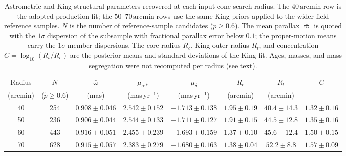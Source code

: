 \documentclass{aa}
\begin{document}
\begin{appendix}
\begin{table}
	\caption{Astrometric and King-structural parameters recovered at each input cone-search radius. The $40\,\mathrm{arcmin}$ row is the adopted production fit; the $50$--$70\,\mathrm{arcmin}$ rows use the same King priors applied to the wider-field reference samples. $N$ is the number of reference-sample candidates ($\tilde{p}\geq0.6$). The mean parallax $\bar{\varpi}$ is quoted with the $1\sigma$ dispersion of the subsample with fractional parallax error below $0.1$; the proper-motion means carry the $1\sigma$ member dispersions. The core radius $R_c$, King outer radius $R_t$, and concentration $C=\log_{10}(R_t/R_c)$ are the posterior means and standard deviations of the King fit. Ages, masses, and mass segregation were not recomputed per radius (see text).}
	\centering
	\begin{tabular}{cccccccc}
		\hline
		Radius & $N$ & $\bar{\varpi}$ & $\mu_{\alpha*}$ & $\mu_{\delta}$ & $R_c$ & $R_t$ & $C$ \\
		(arcmin) & ($\tilde{p}\geq0.6$) & (mas) & (mas\,yr$^{-1}$) & (mas\,yr$^{-1}$) & (arcmin) & (arcmin) &  \\
		\hline
		40 & 254 & $0.908\pm0.046$ & $2.542\pm0.152$ & $-1.713\pm0.138$ & $1.95\pm0.19$ & $40.4\pm14.3$ & $1.32\pm0.16$ \\
		50 & 236 & $0.906\pm0.044$ & $2.544\pm0.133$ & $-1.711\pm0.127$ & $1.91\pm0.15$ & $44.5\pm12.8$ & $1.35\pm0.16$ \\
		60 & 443 & $0.916\pm0.051$ & $2.455\pm0.239$ & $-1.693\pm0.159$ & $1.37\pm0.10$ & $45.6\pm12.4$ & $1.50\pm0.15$ \\
		70 & 628 & $0.915\pm0.057$ & $2.383\pm0.279$ & $-1.680\pm0.163$ & $1.38\pm0.04$ & $52.2\pm8.8$  & $1.57\pm0.09$ \\
		\hline
	\end{tabular}
	\label{tab:cone_params}
\end{table}

\end{appendix}
\end{document}
